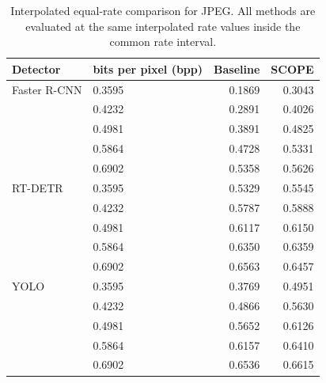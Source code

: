 \begin{table}[t]
\centering
\caption{Interpolated equal-rate comparison for JPEG. All methods are evaluated at the same interpolated rate values inside the common rate interval.}
\label{tab:interpolated_jpeg}
\small
\setlength{\tabcolsep}{6pt}
\begin{tabular}{llrr}
\toprule
Detector & bits per pixel (bpp) & Baseline & SCOPE \\
\midrule
Faster R-CNN & 0.3595 & 0.1869 & 0.3043 \\
 & 0.4232 & 0.2891 & 0.4026 \\
 & 0.4981 & 0.3891 & 0.4825 \\
 & 0.5864 & 0.4728 & 0.5331 \\
 & 0.6902 & 0.5358 & 0.5626 \\
\midrule
RT-DETR & 0.3595 & 0.5329 & 0.5545 \\
 & 0.4232 & 0.5787 & 0.5888 \\
 & 0.4981 & 0.6117 & 0.6150 \\
 & 0.5864 & 0.6350 & 0.6359 \\
 & 0.6902 & 0.6563 & 0.6457 \\
\midrule
YOLO & 0.3595 & 0.3769 & 0.4951 \\
 & 0.4232 & 0.4866 & 0.5630 \\
 & 0.4981 & 0.5652 & 0.6126 \\
 & 0.5864 & 0.6157 & 0.6410 \\
 & 0.6902 & 0.6536 & 0.6615 \\
\bottomrule
\end{tabular}
\end{table}
